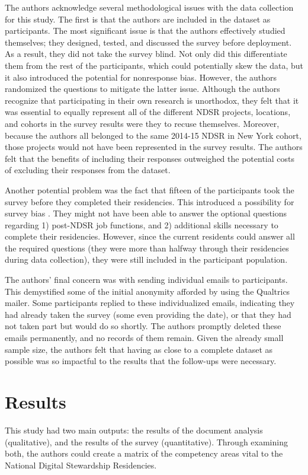 \documentclass{acm_proc_article-sp}
\begin{document}
The authors acknowledge several methodological issues with the data collection for this study. The first is that the authors are included in the dataset as participants. The most significant issue is that the authors effectively studied themselves; they designed, tested, and discussed the survey before deployment. As a result, they did not take the survey blind. Not only did this differentiate them from the rest of the participants, which could potentially skew the data, but it also introduced the potential for nonresponse bias\cite{31}. However, the authors randomized the questions to mitigate the latter issue. Although the authors recognize that participating in their own research is unorthodox, they felt that it was essential to equally represent all of the different NDSR projects, locations, and cohorts in the survey results were they to recuse themselves. Moreover, because the authors all belonged to the same 2014-15 NDSR in New York cohort, those projects would not have been represented in the survey results. The authors felt that the benefits of including their responses  outweighed the potential costs of excluding their responses from the dataset. 

Another potential problem was the fact that fifteen of the participants took the survey before they completed their residencies. This introduced a possibility for survey bias \cite{33}. They might not have been able to answer the optional questions regarding 1) post-NDSR job functions, and 2) additional skills necessary to complete their residencies. However, since the current residents could answer all the required questions (they were more than halfway through their residencies during data collection), they were still included in the participant population. 

The authors' final concern was with sending individual emails to participants. This demystified some of the initial anonymity afforded by using the Qualtrics mailer. Some participants replied to these individualized emails, indicating they had already taken the survey (some even providing the date), or that they had not taken part but would do so shortly. The authors promptly deleted these emails permanently, and no records of them remain. Given the already small sample size, the authors felt that having as close to a complete dataset as possible was so impactful to the results that the follow-ups were necessary. 

\section{Results}
This study had two main outputs: the results of the document analysis (qualitative), and the results of the survey (quantitative). Through examining both, the authors could create a matrix of the competency areas vital to the National Digital Stewardship Residencies.  
\end{document}
